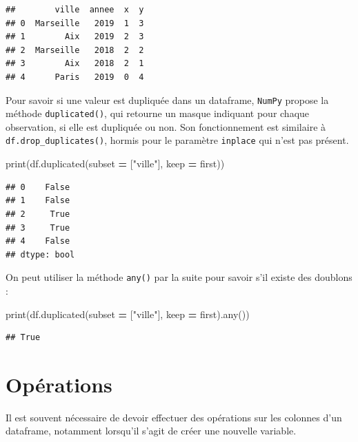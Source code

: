 \documentclass[
  12pt,
]{book}
\newenvironment{Shaded}{\begin{snugshade}}{\end{snugshade}}
\newcommand{\BuiltInTok}[1]{#1}
\newcommand{\NormalTok}[1]{#1}
\newcommand{\OperatorTok}[1]{\textcolor[rgb]{0.81,0.36,0.00}{\textbf{#1}}}
\newcommand{\StringTok}[1]{\textcolor[rgb]{0.31,0.60,0.02}{#1}}
\numberwithin{equation}{section}
\numberwithin{countremarque}{section}
\begin{document}
\begin{lstlisting}
##        ville  annee  x  y
## 0  Marseille   2019  1  3
## 1        Aix   2019  2  3
## 2  Marseille   2018  2  2
## 3        Aix   2018  2  1
## 4      Paris   2019  0  4
\end{lstlisting}

Pour savoir si une valeur est dupliquée dans un dataframe, \texttt{NumPy} propose la méthode \texttt{duplicated()}, qui retourne un masque indiquant pour chaque observation, si elle est dupliquée ou non. Son fonctionnement est similaire à \texttt{df.drop\_duplicates()}, hormis pour le paramètre \texttt{inplace} qui n'est pas présent.

\begin{Shaded}
\begin{Highlighting}[]
\BuiltInTok{print}\NormalTok{(df.duplicated(subset }\OperatorTok{=}\NormalTok{ [}\StringTok{"ville"}\NormalTok{], keep }\OperatorTok{=} \StringTok{\textquotesingle{}first\textquotesingle{}}\NormalTok{))}
\end{Highlighting}
\end{Shaded}

\begin{lstlisting}
## 0    False
## 1    False
## 2     True
## 3     True
## 4    False
## dtype: bool
\end{lstlisting}

On peut utiliser la méthode \texttt{any()} par la suite pour savoir s'il existe des doublons :

\begin{Shaded}
\begin{Highlighting}[]
\BuiltInTok{print}\NormalTok{(df.duplicated(subset }\OperatorTok{=}\NormalTok{ [}\StringTok{"ville"}\NormalTok{], keep }\OperatorTok{=} \StringTok{\textquotesingle{}first\textquotesingle{}}\NormalTok{).}\BuiltInTok{any}\NormalTok{())}
\end{Highlighting}
\end{Shaded}

\begin{lstlisting}
## True
\end{lstlisting}

\section{Opérations}\label{opuxe9rations}

Il est souvent nécessaire de devoir effectuer des opérations sur les colonnes d'un dataframe, notamment lorsqu'il s'agit de créer une nouvelle variable.
\end{document}
